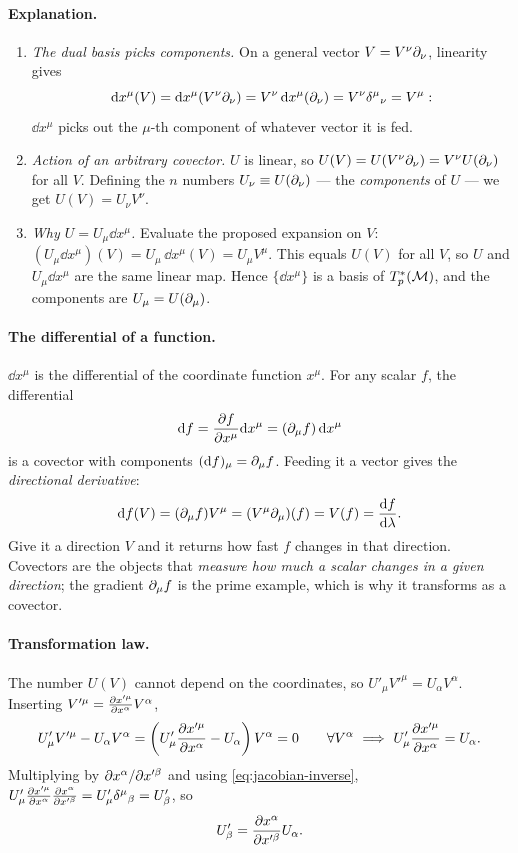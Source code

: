 \paragraph{Explanation.}
\begin{enumerate}
  \item \emph{The dual basis picks components.} On a general vector $V=V^\nu\partial_\nu$, linearity gives
  \[
    \mathrm{d} x^\mu(V)=\mathrm{d} x^\mu(V^\nu\partial_\nu)=V^\nu\,\mathrm{d} x^\mu(\partial_\nu)=V^\nu\delta^\mu{}_\nu=V^\mu :
  \]
  $\dd x^\mu$ picks out the $\mu$-th component of whatever vector it is fed.
  \item \emph{Action of an arbitrary covector.} $U$ is linear, so $U(V)=U(V^\nu\partial_\nu)=V^\nu U(\partial_\nu)$ for all $V$. Defining the $n$ numbers $U_\nu\equiv U(\partial_\nu)$ --- the \emph{components} of $U$ --- we get $U(V)=U_\nu V^\nu$.
  \item \emph{Why $U=U_\mu\dd x^\mu$.} Evaluate the proposed expansion on $V$: $(U_\mu\dd x^\mu)(V)=U_\mu\,\dd x^\mu(V)=U_\mu V^\mu$. This equals $U(V)$ for all $V$, so $U$ and $U_\mu\dd x^\mu$ are the same linear map. Hence $\{\dd x^\mu\}$ is a basis of $T_p^*(\mathcal{M})$, and the components are $U_\mu=U(\partial_\mu)$.
\end{enumerate}

\paragraph{The differential of a function.} $\dd x^\mu$ is the differential of the coordinate function $x^\mu$. For any scalar $f$, the differential
\begin{equation}
  \mathrm{d} f=\frac{\partial f}{\partial x^\mu}\mathrm{d} x^\mu=(\partial_\mu f)\,\mathrm{d} x^\mu
\end{equation}
is a covector with components $(\mathrm{d} f)_\mu=\partial_\mu f$. Feeding it a vector gives the \emph{directional derivative}:
\begin{equation}
  \mathrm{d} f(V)=(\partial_\mu f)V^\mu=(V^\mu\partial_\mu)(f)=V(f)=\frac{\mathrm{d} f}{\mathrm{d}\lambda}.
\end{equation}
Give it a direction $V$ and it returns how fast $f$ changes in that direction. Covectors are the objects that \emph{measure how much a scalar changes in a given direction}; the gradient $\partial_\mu f$ is the prime example, which is why it transforms as a covector.

\paragraph{Transformation law.} The number $U(V)$ cannot depend on the coordinates, so $U'_\mu V'^\mu=U_\alpha V^\alpha$. Inserting $V'^\mu=\frac{\partial x'^\mu}{\partial x^\alpha}V^\alpha$,
\[
  U'_\mu V'^\mu-U_\alpha V^\alpha=\left(U'_\mu\frac{\partial x'^\mu}{\partial x^\alpha}-U_\alpha\right)V^\alpha=0\qquad\forall V^\alpha
  \ \Longrightarrow\ U'_\mu\frac{\partial x'^\mu}{\partial x^\alpha}=U_\alpha .
\]
Multiplying by $\partial x^\alpha/\partial x'^\beta$ and using \eqref{eq:jacobian-inverse}, $U'_\mu\frac{\partial x'^\mu}{\partial x^\alpha}\frac{\partial x^\alpha}{\partial x'^\beta}=U'_\mu\delta^\mu{}_\beta=U'_\beta$, so
\begin{equation}
  U'_\beta=\frac{\partial x^\alpha}{\partial x'^\beta}U_\alpha .
\end{equation}

